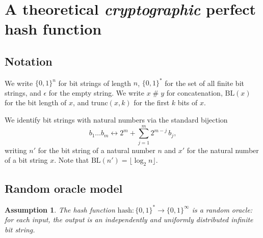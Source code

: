\documentclass[hidelinks,11pt,final]{article}
\theoremstyle{plain}
\newtheorem{assumption}{Assumption}
\newcommand{\cat}{\mathbin{\#}}
\newcommand{\BL}{\mathrm{BL}}
\begin{document}

\section{A theoretical \emph{cryptographic} perfect hash function}

\subsection{Notation}

We write $\{0,1\}^n$ for bit strings of length $n$, $\{0,1\}^*$ for the set of all finite bit strings, and $\epsilon$ for the empty string. We write $x \cat y$ for concatenation, $\BL(x)$ for the bit length of $x$, and $\mathrm{trunc}(x,k)$ for the first $k$ bits of $x$.

We identify bit strings with natural numbers via the standard bijection
\begin{equation}
\label{def:mapping}
b_1 \ldots b_m \longleftrightarrow 2^m + \sum_{j=1}^{m} 2^{m-j}\, b_j,
\end{equation}
writing $n'$ for the bit string of a natural number $n$ and $x'$ for the natural number of a bit string $x$. Note that $\BL(n') = \lfloor \log_2 n \rfloor$.

\subsection{Random oracle model}

\begin{assumption}
\label{asm:ro_approx}
The hash function $\mathrm{hash} : \{0,1\}^* \to \{0,1\}^\infty$ is a random oracle: for each input, the output is an independently and uniformly distributed infinite bit string.
\end{assumption}

\end{document}
